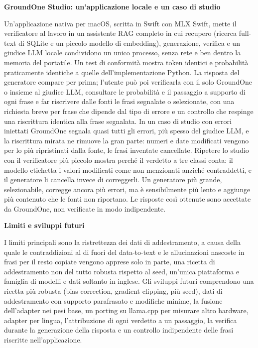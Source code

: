 \documentclass[11pt,a4paper]{article}
\newcommand{\sect}[1]{\par\medskip\noindent\textbf{\large #1}\par\smallskip}
\begin{document}
\sect{GroundOne Studio: un'applicazione locale e un caso di studio}
Un'applicazione nativa per macOS, scritta in Swift con MLX Swift, mette il verificatore al lavoro in un assistente RAG
completo in cui recupero (ricerca full-text di SQLite e un piccolo modello di embedding), generazione, verifica e un
giudice LLM locale condividono un unico processo, senza rete e ben dentro la memoria del portatile. Un test di conformità
mostra token identici e probabilità praticamente identiche a quelle dell'implementazione Python. La risposta del generatore
compare per prima; l'utente può poi verificarla con il solo GroundOne o insieme al giudice LLM, consultare le probabilità e
il passaggio a supporto di ogni frase e far riscrivere dalle fonti le frasi segnalate o selezionate, con una richiesta
breve per frase che dipende dal tipo di errore e un controllo che respinge una riscrittura identica alla frase segnalata.
In un caso di studio con errori iniettati GroundOne segnala quasi tutti gli errori, più spesso del giudice LLM, e la
riscrittura mirata ne rimuove la gran parte: numeri e date modificati vengono per lo più ripristinati dalla fonte, le frasi
inventate cancellate. Ripetere lo studio con il verificatore più piccolo mostra perché il verdetto a tre classi conta: il
modello etichetta i valori modificati come non menzionati anziché contraddetti, e il generatore li cancella invece di
correggerli. Un generatore più grande, selezionabile, corregge ancora più errori, ma è sensibilmente più lento e aggiunge
più contenuto che le fonti non riportano. Le risposte così ottenute sono accettate da GroundOne, non verificate in modo
indipendente.

\sect{Limiti e sviluppi futuri}
I limiti principali sono la ristrettezza dei dati di addestramento, a causa della quale le contraddizioni al di fuori del
data-to-text e le allucinazioni nascoste in frasi per il resto copiate vengono apprese solo in parte, una ricetta di
addestramento non del tutto robusta rispetto al seed, un'unica piattaforma e famiglia di modelli e dati soltanto in
inglese. Gli sviluppi futuri comprendono una ricetta più robusta (bias correction, gradient clipping, più seed), dati di
addestramento con supporto parafrasato e modifiche minime, la fusione dell'adapter nei pesi base, un porting su llama.cpp
per misurare altro hardware, adapter per lingua, l'attribuzione di ogni verdetto a un passaggio, la verifica durante la
generazione della risposta e un controllo indipendente delle frasi riscritte nell'applicazione.
\end{document}
